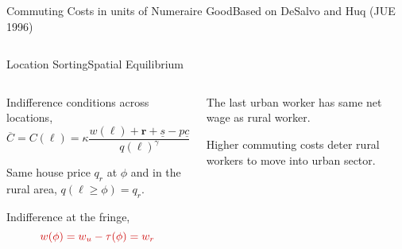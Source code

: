 \documentclass[aspectratio=169]{beamer}
\begin{document}
\begin{v75mins}
\begin{frame}{Commuting Costs in units of Numeraire Good}{Based on DeSalvo and Huq (JUE 1996)}
\begin{columns}
\begin{column}{0.5\textwidth}
	\end{column}
	\end{columns}
	
	\end{frame}

\begin{frame}{Location Sorting}{Spatial Equilibrium}

\begin{columns}
\begin{column}{0.5\textwidth}

\begin{midi}
 \item  Indifference conditions across locations,
\begin{equation*}
 \overline{C}=C(\ell)=\kappa\frac{w(\ell)+\mathbf{r}+ \underline{s} - p\underline{c}}{q(\ell)^{\gamma}}.
\end{equation*}
\item Same house price $q_r$ at $\phi$ and in the rural area, $q(\ell \geq \phi)=q_r$.
\item Indifference at the fringe,
\begin{equation*}
\re{w(\phi)=w_u -\tau(\phi)=w_r}
\end{equation*}
\end{midi} 
\end{column}		
\pause
\begin{column}{0.5\textwidth}

	\begin{midi}
		\item The last urban worker has same net wage as rural worker.
		\item Higher commuting costs deter rural workers to move into urban sector.
	\end{midi}
	
\end{column}


% 
\end{columns}

\end{frame}


\end{v75mins}
\end{document}
